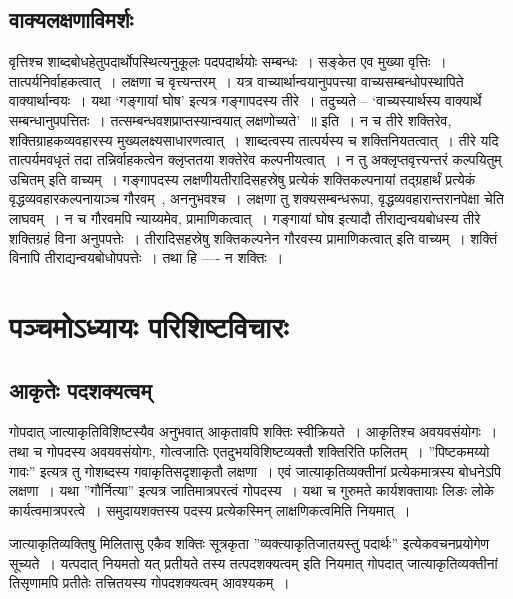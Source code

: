 	\section{वाक्यलक्षणाविमर्शः}

		वृत्तिश्च शाब्दबोधहेतुपदार्थोपस्थित्यनुकूलः पदपदार्थयोः सम्बन्धः~। सङ्केत एव मुख्या वृत्तिः~। तात्पर्यनिर्वाहकत्वात्~। लक्षणा च वृत्त्यन्तरम्~। यत्र वाच्यार्थान्वयानुपपत्त्या वाच्यसम्बन्धोपस्थापिते वाक्यार्थान्वयः~। यथा ‘गङ्गायां घोष’ इत्यत्र गङ्गापदस्य तीरे~। तदुच्यते – ‘वाच्यस्यार्थस्य वाक्यार्थे सम्बन्धानुपपत्तितः~। तत्सम्बन्धवशप्राप्तस्यान्वयात् लक्षणोच्यते’~॥ इति~। न च तीरे शक्तिरेव, शक्तिग्राहकव्यवहारस्य मुख्यलक्ष्यसाधारणत्वात्~। शाब्दत्वस्य तात्पर्यस्य च शक्तिनियतत्वात्~। तीरे यदि तात्पर्यमवधृतं तदा तन्निर्वाहकत्वेन क्लृप्ततया शक्तेरेव कल्पनीयत्वात्~। न तु अक्लृप्तवृत्त्यन्तरं कल्पयितुम् उचितम् इति वाच्यम्~। गङ्गापदस्य लक्षणीयतीरादिसहस्रेषु प्रत्येकं शक्तिकल्पनायां तद्ग्रहार्थं प्रत्येकं वृद्धव्यवहारकल्पनायाञ्च गौरवम्~, अननुभवश्च~। लक्षणा तु शक्यसम्बन्धरूपा, वृद्धव्यवहारान्तरानपेक्षा चेति लाघवम्~। न च गौरवमपि न्याय्यमेव, प्रामाणिकत्वात्~। गङ्गायां घोष इत्यादौ तीराद्यन्वयबोधस्य तीरे शक्तिग्रहं विना अनुपपत्तेः~। तीरादिसहस्रेषु शक्तिकल्पनेन गौरवस्य प्रामाणिकत्वात् इति वाच्यम्~। शक्तिं विनापि तीराद्यन्वयबोधोपपत्तेः~। तथा हि ---- न शक्तिः~। 

\chapter{पञ्चमोऽध्यायः परिशिष्टविचारः}

	\section{आकृतेः पदशक्यत्वम्} 
	
		गोपदात् जात्याकृतिविशिष्टस्यैव अनुभवात् आकृतावपि शक्तिः स्वीक्रियते~। आकृतिश्च अवयवसंयोगः~।  तथा च गोपदस्य अवयवसंयोगः, गोत्वजातिः एतदुभयविशिष्टव्यक्तौ शक्तिरिति फलितम्~।  ”पिष्टकमय्यो गावः” इत्यत्र तु गोशब्दस्य गवाकृतिसदृशाकृतौ लक्षणा~। एवं जात्याकृतिव्यक्तीनां प्रत्येकमात्रस्य बोधनेऽपि लक्षणा~।  यथा ”गौर्नित्या” इत्यत्र जातिमात्रपरत्वं गोपदस्य~।  यथा च गुरुमते कार्यशक्तायाः लिङः लोके  कार्यत्वमात्रपरत्वे~।  समुदायशक्तस्य पदस्य प्रत्येकस्मिन् लाक्षणिकत्वमिति नियमात्~। 

		जात्याकृतिव्यक्तिषु मिलितासु एकैव शक्तिः सूत्रकृता ”व्यक्त्याकृतिजातयस्तु पदार्थः” इत्येकवचनप्रयोगेण सूच्यते~।  यत्पदात् नियमतो यत् प्रतीयते तस्य तत्पदशक्यत्वम् इति नियमात् गोपदात् जात्याकृतिव्यक्तीनां तिसृणामपि प्रतीतेः तत्त्रितयस्य गोपदशक्यत्वम् आवश्यकम्~। 

